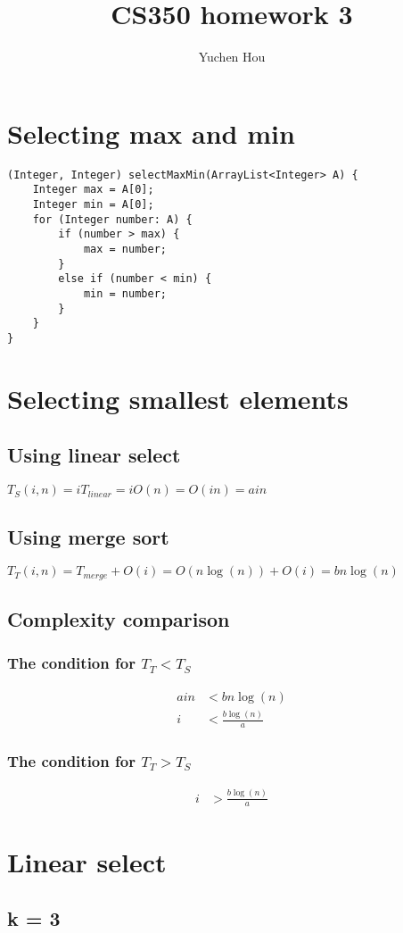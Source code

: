 \documentclass{article}
\begin{document}
\lstset{language=Java}
\title{CS350 homework 3}
\author{Yuchen Hou}
\maketitle
\section{Selecting max and min}
\begin{lstlisting}
(Integer, Integer) selectMaxMin(ArrayList<Integer> A) {
	Integer max = A[0];
	Integer min = A[0];
	for (Integer number: A) {
		if (number > max) {
			max = number;
		}
		else if (number < min) {
			min = number;
		}
	}
}
\end{lstlisting}
\section{Selecting smallest elements}
\subsection{Using linear select}
$T_S(i, n) = i T_{linear} = i O(n) = O(in) = a i n$
\subsection{Using merge sort}
$T_T(i, n) = T_{merge} + O(i) = O(n \log (n)) + O(i) = b n \log(n)$
\subsection{Complexity comparison}
\subsubsection{The condition for $T_T < T_S$}
\begin{align*}
ain &< b n \log(n)\\
i &< \frac{b\log(n)}{a}
\end{align*}
\subsubsection{The condition for $T_T > T_S$}
\begin{align*}
i &> \frac{b\log(n)}{a}
\end{align*}
\section{Linear select}
\subsection{k = 3}
\end{document}
